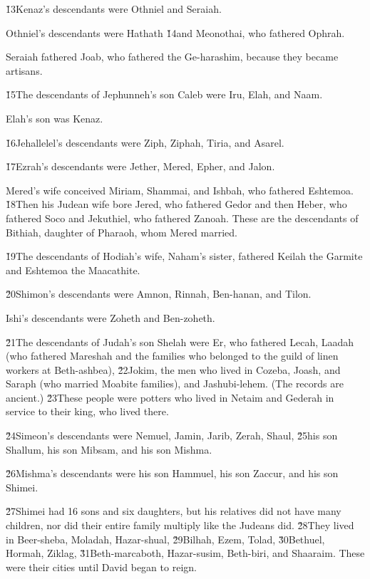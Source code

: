 \v{13}Kenaz's descendants were Othniel and Seraiah.

Othniel's descendants were Hathath \v{14}and Meonothai, who fathered Ophrah.

Seraiah fathered Joab, who fathered the Ge-harashim, because they became artisans.

\v{15}The descendants of Jephunneh's son Caleb were Iru, Elah, and Naam.

Elah's son was Kenaz.

\v{16}Jehallelel's descendants were Ziph, Ziphah, Tiria, and Asarel.

\v{17}Ezrah's descendants were Jether, Mered, Epher, and Jalon.

Mered's wife conceived Miriam, Shammai, and Ishbah, who fathered Eshtemoa. \v{18}Then his Judean wife bore Jered, who fathered Gedor and then Heber, who fathered Soco and Jekuthiel, who fathered Zanoah. These are the descendants of Bithiah, daughter of Pharaoh, whom Mered married.

\v{19}The descendants of Hodiah's wife, Naham's sister, fathered Keilah the Garmite and Eshtemoa the Maacathite.

\v{20}Shimon's descendants were Amnon, Rinnah, Ben-hanan, and Tilon.

Ishi's descendants were Zoheth and Ben-zoheth.

\v{21}The descendants of Judah's son Shelah were Er, who fathered Lecah, Laadah (who fathered Mareshah and the families who belonged to the guild of linen workers at Beth-ashbea), \v{22}Jokim, the men who lived in Cozeba, Joash, and Saraph (who married Moabite families), and Jashubi-lehem. (The records are ancient.) \v{23}These people were potters who lived in Netaim and Gederah in service to their king, who lived there.

\v{24}Simeon's descendants were Nemuel, Jamin, Jarib, Zerah, Shaul, \v{25}his son Shallum, his son Mibsam, and his son Mishma.

\v{26}Mishma's descendants were his son Hammuel, his son Zaccur, and his son Shimei.

\v{27}Shimei had 16 sons and six daughters, but his relatives did not have many children, nor did their entire family multiply like the Judeans did. \v{28}They lived in Beer-sheba, Moladah, Hazar-shual, \v{29}Bilhah, Ezem, Tolad, \v{30}Bethuel, Hormah, Ziklag, \v{31}Beth-marcaboth, Hazar-susim, Beth-biri, and Shaaraim. These were their cities until David began to reign.


